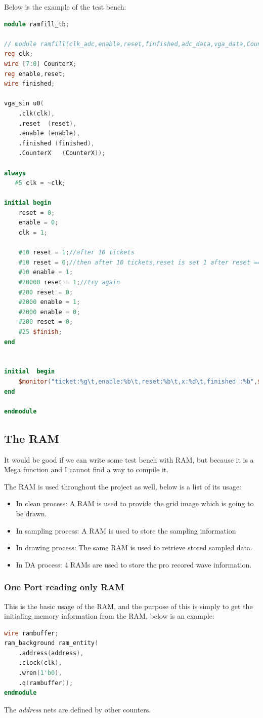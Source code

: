 \documentclass[11pt]{scrartcl}
\begin{document}
Below is the example of the test bench:
\begin{lstlisting}[language=Verilog]
module ramfill_tb;

// module ramfill(clk_adc,enable,reset,finfished,adc_data,vga_data,CounterX);
reg clk;
wire [7:0] CounterX;
reg enable,reset;
wire finished;

vga_sin u0(
	.clk(clk), 
	.reset	(reset),
	.enable (enable),
	.finished (finished), 
	.CounterX	(CounterX));

always  
   #5 clk = ~clk; 
    
initial begin
	reset = 0;
	enable = 0;
	clk = 1;

	#10 reset = 1;//after 10 tickets
	#10 reset = 0;//then after 10 tickets,reset is set 1 after reset == 1 is kept for 10 tickets
	#10 enable = 1;
	#20000 reset = 1;//try again
	#200 reset = 0;
	#2000 enable = 1;
	#2000 enable = 0;
	#200 reset = 0;
	#25 $finish; 
end


initial  begin
    $monitor("ticket:%g\t,enable:%b\t,reset:%b\t,x:%d\t,finished :%b",$time,enable,reset,CounterX,finished); 
end 

endmodule
\end{lstlisting}

\subsection{The RAM}
It would be good if we can write some test bench with RAM, but because it is a Mega function and I cannot find a way to compile it.


The RAM is used throughout the project as well, below is a list of its usage:
\begin{itemize}
    \item In clean process: A RAM is used to provide the grid image which is going to be drawn.
    \item In sampling process: A RAM is used to store the sampling information
    \item In drawing process: The same RAM is used to retrieve stored sampled data.
    \item In DA process: 4 RAMs are used to store the pro recored wave information. 
    \end{itemize}
\subsubsection{One Port reading only RAM}
\label{sec:siram}
This is the basic usage of the RAM, and the purpose of this is simply to get the initialing memory information from the RAM, below is an example:
\begin{lstlisting}[language=Verilog]
wire rambuffer;
ram_background ram_entity(
 	.address(address),
 	.clock(clk),
 	.wren(1'b0),
 	.q(rambuffer));
endmodule
\end{lstlisting}
The \textit{address} nets are defined by other counters.
\end{document}
